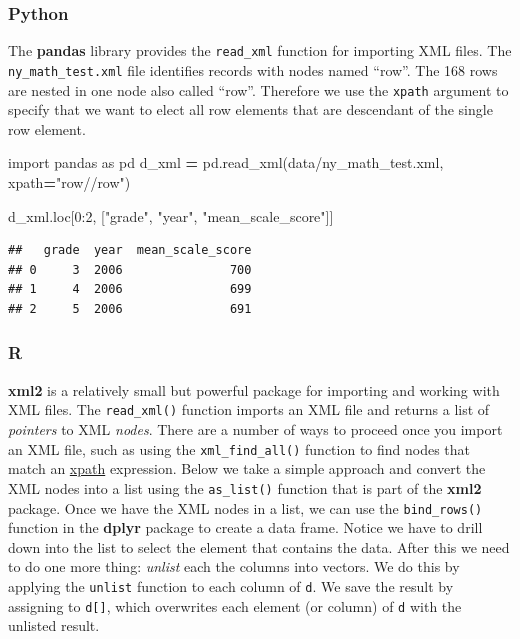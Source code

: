 \documentclass[
]{book}
\newenvironment{Shaded}{\begin{snugshade}}{\end{snugshade}}
\newcommand{\DecValTok}[1]{\textcolor[rgb]{0.00,0.00,0.81}{#1}}
\newcommand{\ImportTok}[1]{#1}
\newcommand{\NormalTok}[1]{#1}
\newcommand{\OperatorTok}[1]{\textcolor[rgb]{0.81,0.36,0.00}{\textbf{#1}}}
\newcommand{\StringTok}[1]{\textcolor[rgb]{0.31,0.60,0.02}{#1}}
\begin{document}
\hypertarget{python-15}{%
\subsubsection*{Python}\label{python-15}}

The \textbf{pandas} library provides the \texttt{read\_xml} function for importing XML files. The \texttt{ny\_math\_test.xml} file identifies records with nodes named ``row''. The 168 rows are nested in one node also called ``row''. Therefore we use the \texttt{xpath} argument to specify that we want to elect all row elements that are descendant of the single row element.

\begin{Shaded}
\begin{Highlighting}[]
\ImportTok{import}\NormalTok{ pandas }\ImportTok{as}\NormalTok{ pd}
\NormalTok{d\_xml }\OperatorTok{=}\NormalTok{ pd.read\_xml(}\StringTok{\textquotesingle{}data/ny\_math\_test.xml\textquotesingle{}}\NormalTok{, xpath}\OperatorTok{=}\StringTok{"row//row"}\NormalTok{)}

\NormalTok{d\_xml.loc[}\DecValTok{0}\NormalTok{:}\DecValTok{2}\NormalTok{, [}\StringTok{"grade"}\NormalTok{, }\StringTok{"year"}\NormalTok{, }\StringTok{"mean\_scale\_score"}\NormalTok{]]  }
\end{Highlighting}
\end{Shaded}

\begin{verbatim}
##   grade  year  mean_scale_score
## 0     3  2006               700
## 1     4  2006               699
## 2     5  2006               691
\end{verbatim}

\hypertarget{r-15}{%
\subsubsection*{R}\label{r-15}}

\textbf{xml2} is a relatively small but powerful package for importing and working with XML files. The \texttt{read\_xml()} function imports an XML file and returns a list of \emph{pointers} to XML \emph{nodes}. There are a number of ways to proceed once you import an XML file, such as using the \texttt{xml\_find\_all()} function to find nodes that match an \href{https://www.w3schools.com/xml/xpath_intro.asp}{xpath} expression. Below we take a simple approach and convert the XML nodes into a list using the \texttt{as\_list()} function that is part of the \textbf{xml2} package. Once we have the XML nodes in a list, we can use the \texttt{bind\_rows()} function in the \textbf{dplyr} package to create a data frame. Notice we have to drill down into the list to select the element that contains the data. After this we need to do one more thing: \emph{unlist} each the columns into vectors. We do this by applying the \texttt{unlist} function to each column of \texttt{d}. We save the result by assigning to \texttt{d{[}{]}}, which overwrites each element (or column) of \texttt{d} with the unlisted result.
\end{document}
